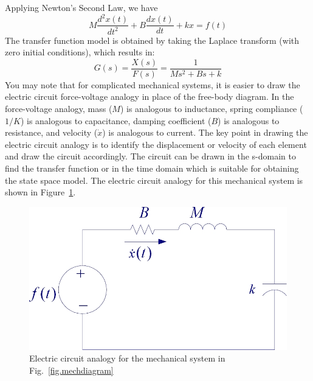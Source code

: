 Applying Newton's Second Law, we have
\begin{equation}
    M\frac{d^2 x(t)}{dt^2} + B\frac{d x(t)}{dt} + kx = f(t)
        \label{eq.mechfreebody}
\end{equation}
The transfer function model is obtained by taking the Laplace transform (with zero initial conditions), which results in:
\begin{equation}
    G(s) = \frac{X(s)}{F(s)} = \frac{1}{Ms^2 + Bs + k}
        \label{eq.mechtf}
\end{equation}
You may note that for complicated mechanical systems, it is easier to draw the electric circuit force-voltage analogy in place of the free-body diagram.  In the force-voltage analogy, mass ($M$) is analogous to inductance, spring compliance ($1/K$) is analogous to capacitance, damping coefficient ($B$) is analogous to resistance, and velocity ($\dot{x}$) is analogous to current.  The key point in drawing the electric circuit analogy is to identify the displacement or velocity of each element and draw the circuit accordingly.  The circuit can be drawn in the s-domain to find the transfer function or in the time domain which is suitable for obtaining the state space model.  The electric circuit analogy for this mechanical system is shown in Figure~\ref{fig.mechelecanalogy}.

\begin{figure}[bht]
\centering
\includegraphics[width=.5\textwidth]{mechelecanalogy}
\caption{\footnotesize
        Electric circuit analogy for the mechanical system in Fig.\ \ref{fig.mechdiagram}
        \label{fig.mechelecanalogy}
        }
\end{figure}

